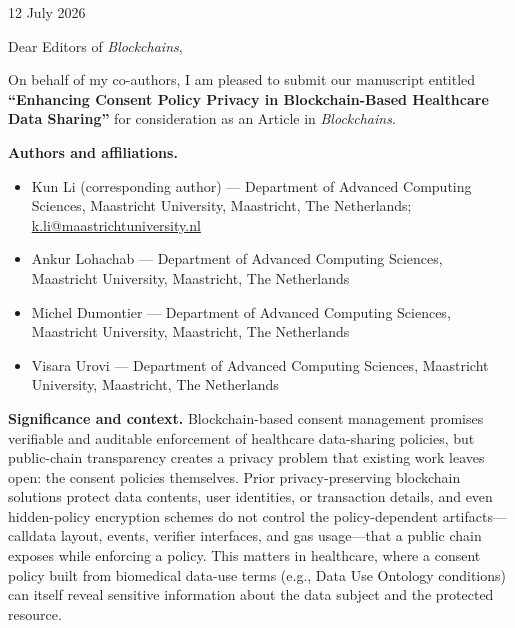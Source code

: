 \documentclass[11pt]{article}
\begin{document}
\begin{flushright}
	12 July 2026
\end{flushright}

Dear Editors of \emph{Blockchains},

On behalf of my co-authors, I am pleased to submit our manuscript entitled
\textbf{``Enhancing Consent Policy Privacy in Blockchain-Based Healthcare Data
Sharing''} for consideration as an Article in \emph{Blockchains}.

\textbf{Authors and affiliations.}
\begin{itemize}
	\setlength\itemsep{0.1em}
	\item Kun Li (corresponding author) --- Department of Advanced Computing
	      Sciences, Maastricht University, Maastricht, The Netherlands;
	      \href{mailto:k.li@maastrichtuniversity.nl}{k.li@maastrichtuniversity.nl}
	\item Ankur Lohachab --- Department of Advanced Computing Sciences,
	      Maastricht University, Maastricht, The Netherlands
	\item Michel Dumontier --- Department of Advanced Computing Sciences,
	      Maastricht University, Maastricht, The Netherlands
	\item Visara Urovi --- Department of Advanced Computing Sciences,
	      Maastricht University, Maastricht, The Netherlands
\end{itemize}

\textbf{Significance and context.}
Blockchain-based consent management promises verifiable and auditable
enforcement of healthcare data-sharing policies, but public-chain transparency
creates a privacy problem that existing work leaves open: the consent policies
themselves. Prior privacy-preserving blockchain solutions protect data
contents, user identities, or transaction details, and even hidden-policy
encryption schemes do not control the policy-dependent artifacts---calldata
layout, events, verifier interfaces, and gas usage---that a public chain
exposes while enforcing a policy. This matters in healthcare, where a consent
policy built from biomedical data-use terms (e.g., Data Use Ontology
conditions) can itself reveal sensitive information about the data subject and
the protected resource.
\end{document}
